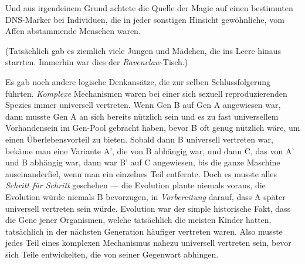 Und aus irgendeinem Grund achtete die Quelle der Magie auf einen bestimmten DNS-Marker bei Individuen, die in jeder sonstigen Hinsicht gewöhnliche, vom Affen abstammende Menschen waren.

(Tatsächlich gab es ziemlich viele Jungen und Mädchen, die ins Leere hinaus starrten. Immerhin war dies der \emph{Ravenclaw}-Tisch.)

Es gab noch andere logische Denkansätze, die zur selben Schlussfolgerung führten. \emph{Komplexe} Mechanismen waren bei einer sich sexuell reproduzierenden Spezies immer universell vertreten. Wenn Gen B auf Gen A angewiesen war, dann musste Gen A an sich bereits nützlich sein und es zu fast universellem Vorhandensein im Gen-Pool gebracht haben, bevor B oft genug nützlich wäre, um einen Überlebensvorteil zu bieten. Sobald dann B universell vertreten war, bekäme man eine Variante A’, die von B abhängig war, und dann C, das von A’ und B abhängig war, dann war B’ auf C angewiesen, bis die ganze Maschine auseinanderfiel, wenn man ein einzelnes Teil entfernte. Doch es musste alles \emph{Schritt für Schritt} geschehen — die Evolution plante niemals voraus, die Evolution würde niemals B bevorzugen, in \emph{Vorbereitung} darauf, dass A später universell vertreten sein würde. Evolution war der simple historische Fakt, dass die Gene jener Organismen, welche tatsächlich die meisten Kinder hatten, tatsächlich in der nächsten Generation häufiger vertreten waren. Also musste jedes Teil eines komplexen Mechanismus nahezu universell vertreten sein, bevor sich Teile entwickelten, die von seiner Gegenwart abhingen.


